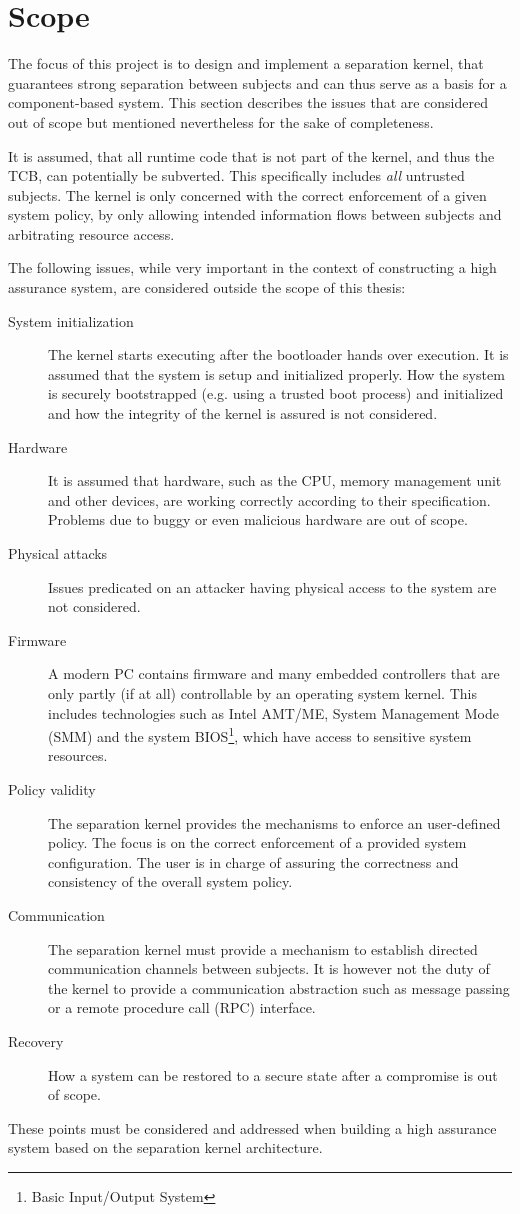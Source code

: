 \section{Scope}
The focus of this project is to design and implement a separation kernel, that
guarantees strong separation between subjects and can thus serve as a basis for
a component-based system. This section describes the issues that are considered
out of scope but mentioned nevertheless for the sake of completeness.

It is assumed, that all runtime code that is not part of the kernel, and thus
the TCB, can potentially be subverted. This specifically includes \emph{all}
untrusted subjects. The kernel is only concerned with the correct enforcement of
a given system policy, by only allowing intended information flows between
subjects and arbitrating resource access.

The following issues, while very important in the context of constructing a
high assurance system, are considered outside the scope of this thesis:

\begin{description}
	\item[System initialization] The kernel starts executing after the
		bootloader hands over execution. It is assumed that the system is setup
		and initialized properly. How the system is securely bootstrapped (e.g.
		using a trusted boot process) and initialized and how the integrity of
		the kernel is assured is not considered.
	\item[Hardware] It is assumed that hardware, such as the CPU, memory
		management unit and other devices, are working correctly according to
		their specification. Problems due to buggy or even malicious hardware
		are out of scope.
	\item[Physical attacks] Issues predicated on an attacker having physical
		access to the system are not considered.
	\item[Firmware] A modern PC contains firmware and many embedded controllers
		that are only partly (if at all) controllable by an operating system
		kernel. This includes technologies such as Intel AMT/ME, System
		Management Mode (SMM) and the system BIOS\footnote{Basic
		Input/Output System}, which have access to sensitive system resources.
	\item[Policy validity] The separation kernel provides the mechanisms to
		enforce an user-defined policy. The focus is on the correct enforcement
		of a provided system configuration. The user is in charge of assuring
		the correctness and consistency of the overall system policy.
	\item[Communication] The separation kernel must provide a mechanism to
		establish directed communication channels between subjects.	It is
		however not the duty of the kernel to provide a	communication
		abstraction such as message passing or a remote procedure call (RPC)
		interface.
	\item[Recovery] How a system can be restored to a secure state after a
		compromise is out of scope.
\end{description}

These points must be considered and addressed when building a high assurance
system based on the separation kernel architecture.
